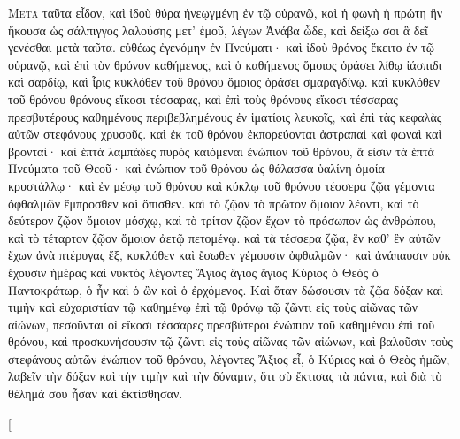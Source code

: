 \begin{pages}
    \begin{Rightside}
        \beginnumbering
		\renewcommand{\LettrineFontHook}{\PHtitl}
		\lettrine[lines=3,lraise=0.0]{Μ}{ετὰ} ταῦτα εἶδον, καὶ ἰδοὺ θύρα ἠνεῳγμένη ἐν τῷ οὐρανῷ, καὶ ἡ φωνὴ ἡ πρώτη ἣν ἤκουσα ὡς σάλπιγγος λαλούσης μετ’ ἐμοῦ, λέγων Ἀνάβα ὧδε, καὶ δείξω σοι ἃ δεῖ γενέσθαι μετὰ ταῦτα. εὐθέως ἐγενόμην ἐν Πνεύματι· καὶ ἰδοὺ θρόνος ἔκειτο ἐν τῷ οὐρανῷ, καὶ ἐπὶ τὸν θρόνον καθήμενος, καὶ ὁ καθήμενος ὅμοιος ὁράσει λίθῳ ἰάσπιδι καὶ σαρδίῳ, καὶ ἶρις κυκλόθεν τοῦ θρόνου ὅμοιος ὁράσει σμαραγδίνῳ. καὶ κυκλόθεν τοῦ θρόνου θρόνους εἴκοσι τέσσαρας, καὶ ἐπὶ τοὺς θρόνους εἴκοσι τέσσαρας πρεσβυτέρους καθημένους περιβεβλημένους ἐν ἱματίοις λευκοῖς, καὶ ἐπὶ τὰς κεφαλὰς αὐτῶν στεφάνους χρυσοῦς. καὶ ἐκ τοῦ θρόνου ἐκπορεύονται ἀστραπαὶ καὶ φωναὶ καὶ βρονταί· καὶ ἑπτὰ λαμπάδες πυρὸς καιόμεναι ἐνώπιον τοῦ θρόνου, ἅ εἰσιν τὰ ἑπτὰ Πνεύματα τοῦ Θεοῦ· καὶ ἐνώπιον τοῦ θρόνου ὡς θάλασσα ὑαλίνη ὁμοία κρυστάλλῳ·
		\pend
		\pstart
		καὶ ἐν μέσῳ τοῦ θρόνου καὶ κύκλῳ τοῦ θρόνου τέσσερα ζῷα γέμοντα ὀφθαλμῶν ἔμπροσθεν καὶ ὄπισθεν. καὶ τὸ ζῷον τὸ πρῶτον ὅμοιον λέοντι, καὶ τὸ δεύτερον ζῷον ὅμοιον μόσχῳ, καὶ τὸ τρίτον ζῷον ἔχων τὸ πρόσωπον ὡς ἀνθρώπου, καὶ τὸ τέταρτον ζῷον ὅμοιον ἀετῷ πετομένῳ. καὶ τὰ τέσσερα ζῷα, ἓν καθ’ ἓν αὐτῶν ἔχων ἀνὰ πτέρυγας ἕξ, κυκλόθεν καὶ ἔσωθεν γέμουσιν ὀφθαλμῶν· καὶ ἀνάπαυσιν οὐκ ἔχουσιν ἡμέρας καὶ νυκτὸς λέγοντες Ἅγιος ἅγιος ἅγιος Κύριος ὁ Θεός ὁ Παντοκράτωρ, ὁ ἦν καὶ ὁ ὢν καὶ ὁ ἐρχόμενος. 
		\pend
		\pstart
		Καὶ ὅταν δώσουσιν τὰ ζῷα δόξαν καὶ τιμὴν καὶ εὐχαριστίαν τῷ καθημένῳ ἐπὶ τῷ θρόνῳ τῷ ζῶντι εἰς τοὺς αἰῶνας τῶν αἰώνων, πεσοῦνται οἱ εἴκοσι τέσσαρες πρεσβύτεροι ἐνώπιον τοῦ καθημένου ἐπὶ τοῦ θρόνου, καὶ προσκυνήσουσιν τῷ ζῶντι εἰς τοὺς αἰῶνας τῶν αἰώνων, καὶ βαλοῦσιν τοὺς στεφάνους αὐτῶν ἐνώπιον τοῦ θρόνου, λέγοντες Ἄξιος εἶ, ὁ Κύριος καὶ ὁ Θεὸς ἡμῶν, λαβεῖν τὴν δόξαν καὶ τὴν τιμὴν καὶ τὴν δύναμιν, ὅτι σὺ ἔκτισας τὰ πάντα, καὶ διὰ τὸ θέλημά σου ἦσαν καὶ ἐκτίσθησαν.
		\pend
        \endnumbering
    \end{Rightside}
    \begin{Leftside}
        \beginnumbering
        \pstart[

\end{Leftside}
\end{pages}
